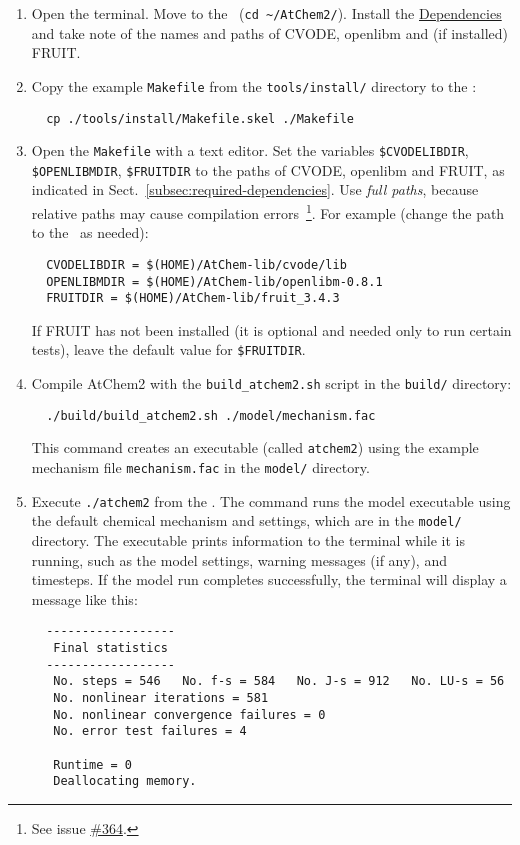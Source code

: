 \begin{enumerate}
\item Open the terminal. Move to the \maindir\ (\verb|cd ~/AtChem2/|).
  Install the \hyperref[sec:dependencies]{Dependencies} and take note
  of the names and paths of CVODE, openlibm and (if installed) FRUIT.
\item Copy the example \texttt{Makefile} from the \texttt{tools/install/}
  directory to the \maindir:
  \begin{verbatim}
  cp ./tools/install/Makefile.skel ./Makefile
  \end{verbatim}
\item Open the \texttt{Makefile} with a text editor. Set the variables
  \texttt{\$CVODELIBDIR}, \texttt{\$OPENLIBMDIR}, \texttt{\$FRUITDIR}
  to the paths of CVODE, openlibm and FRUIT, as indicated in
  Sect.~\ref{subsec:required-dependencies}. Use \emph{full paths},
  because relative paths may cause compilation errors~\footnote{See
    issue \href{https://github.com/AtChem/AtChem2/issues/364}{\#364}.}.
  For example (change the path to the \depdir\ as needed):
  \begin{verbatim}
  CVODELIBDIR = $(HOME)/AtChem-lib/cvode/lib
  OPENLIBMDIR = $(HOME)/AtChem-lib/openlibm-0.8.1
  FRUITDIR = $(HOME)/AtChem-lib/fruit_3.4.3
  \end{verbatim}
  If FRUIT has not been installed (it is optional and needed only to
  run certain tests), leave the default value for \texttt{\$FRUITDIR}.
\item Compile AtChem2 with the \texttt{build\_atchem2.sh} script in
  the \texttt{build/} directory:
  \begin{verbatim}
  ./build/build_atchem2.sh ./model/mechanism.fac
  \end{verbatim}
  This command creates an executable (called \texttt{atchem2}) using
  the example mechanism file \texttt{mechanism.fac} in the
  \texttt{model/} directory.
\item Execute \verb|./atchem2| from the \maindir. The command runs the
  model executable using the default chemical mechanism and settings,
  which are in the \texttt{model/} directory. The executable prints
  information to the terminal while it is running, such as the
  model settings, warning messages (if any), and timesteps. If the
  model run completes successfully, the terminal will display a
  message like this:
  \begin{verbatim}
  ------------------
   Final statistics
  ------------------
   No. steps = 546   No. f-s = 584   No. J-s = 912   No. LU-s = 56
   No. nonlinear iterations = 581
   No. nonlinear convergence failures = 0
   No. error test failures = 4

   Runtime = 0
   Deallocating memory.
  \end{verbatim}
\end{enumerate}

